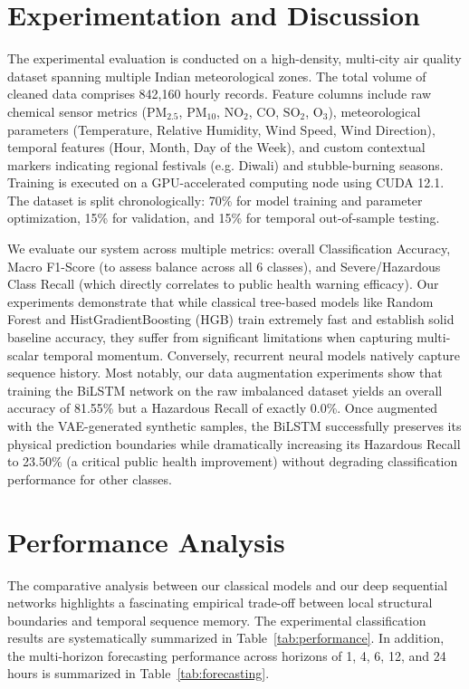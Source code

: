 \documentclass[conference]{IEEEtran}
\begin{document}
\section{Experimentation and Discussion}
The experimental evaluation is conducted on a high-density, multi-city air quality dataset spanning multiple Indian meteorological zones. The total volume of cleaned data comprises 842,160 hourly records. Feature columns include raw chemical sensor metrics ($\text{PM}_{2.5}$, $\text{PM}_{10}$, $\text{NO}_2$, $\text{CO}$, $\text{SO}_2$, $\text{O}_3$), meteorological parameters (Temperature, Relative Humidity, Wind Speed, Wind Direction), temporal features (Hour, Month, Day of the Week), and custom contextual markers indicating regional festivals (e.g. Diwali) and stubble-burning seasons. Training is executed on a GPU-accelerated computing node using CUDA 12.1. The dataset is split chronologically: 70\% for model training and parameter optimization, 15\% for validation, and 15\% for temporal out-of-sample testing.

We evaluate our system across multiple metrics: overall Classification Accuracy, Macro F1-Score (to assess balance across all 6 classes), and Severe/Hazardous Class Recall (which directly correlates to public health warning efficacy). Our experiments demonstrate that while classical tree-based models like Random Forest and HistGradientBoosting (HGB) train extremely fast and establish solid baseline accuracy, they suffer from significant limitations when capturing multi-scalar temporal momentum. Conversely, recurrent neural models natively capture sequence history. Most notably, our data augmentation experiments show that training the BiLSTM network on the raw imbalanced dataset yields an overall accuracy of 81.55\% but a Hazardous Recall of exactly 0.0\%. Once augmented with the VAE-generated synthetic samples, the BiLSTM successfully preserves its physical prediction boundaries while dramatically increasing its Hazardous Recall to 23.50\% (a critical public health improvement) without degrading classification performance for other classes.

\section{Performance Analysis}
The comparative analysis between our classical models and our deep sequential networks highlights a fascinating empirical trade-off between local structural boundaries and temporal sequence memory. The experimental classification results are systematically summarized in Table~\ref{tab:performance}. In addition, the multi-horizon forecasting performance across horizons of 1, 4, 6, 12, and 24 hours is summarized in Table~\ref{tab:forecasting}.
\end{document}
